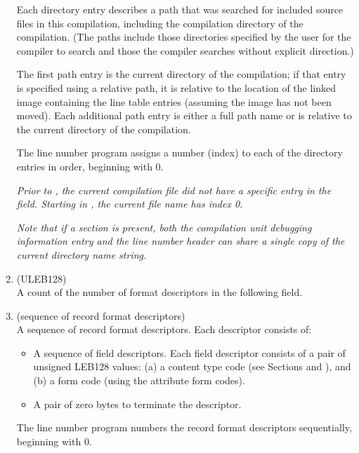 \begin{enumerate}[1. ]
Each directory entry describes a path that was
\eb
searched for included source files in this compilation,
including the compilation directory of the compilation.
(The paths include those directories specified by the
user for the compiler to search and those the compiler
searches without explicit direction.)
   
The first 
\bb
path
\eb
entry is the current directory of the compilation;
\bb
if that entry is specified using a relative path, it is relative 
to the location of the linked image containing the line table
entries (assuming the image has not been moved).
\eb
Each additional path entry is either a full path name or
is relative to the current directory of the compilation.
   
The line number program assigns a number (index) to each
of the directory entries in order, beginning with 0.
   
\textit{Prior to \DWARFVersionV, the current 
\bb
compilation file did not have a specific entry in the
\HFNfilenames{} field. Starting in \DWARFVersionV,
the current file name has index 0.}
\eb

\textit{Note that if a \dotdebuglinestr{} section is present, 
both the compilation unit debugging information entry 
and the line number header can
share a single copy of the current directory name string.}

\bb
\item \HFNfilenameformatcount{} (ULEB128) \\
A count of the number of format descriptors in the following 
\HFNfilenameformattable{} field. 
\eb

\bb
\item \HFNfilenameformattable{} (sequence of record format descriptors) \\
A sequence of record format descriptors. Each descriptor consists of:
\begin{itemize}
\setlength{\itemsep}{0em}
\item A sequence of field descriptors. Each field descriptor consists
of a pair of unsigned LEB128 values: (a) a content type code (see 
Sections  and
), and 
(b) a form code (using the attribute form codes).
\item A pair of zero bytes to terminate the descriptor.
\end{itemize}

The line number program numbers the record format descriptors
sequentially, beginning with 0.


\end{enumerate}
